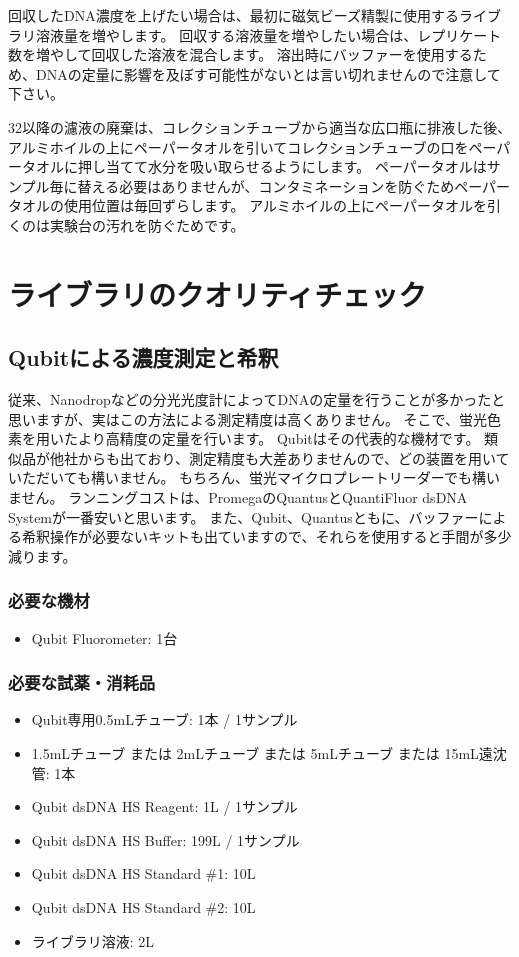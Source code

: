 \documentclass[titlepage,10pt,a4paper,uplatex]{jsbook}
\begin{document}
回収したDNA濃度を上げたい場合は、最初に磁気ビーズ精製に使用するライブラリ溶液量を増やします。
回収する溶液量を増やしたい場合は、レプリケート数を増やして回収した溶液を混合します。
溶出時にバッファーを使用するため、DNAの定量に影響を及ぼす可能性がないとは言い切れませんので注意して下さい。

32以降の濾液の廃棄は、コレクションチューブから適当な広口瓶に排液した後、アルミホイルの上にペーパータオルを引いてコレクションチューブの口をペーパータオルに押し当てて水分を吸い取らせるようにします。
ペーパータオルはサンプル毎に替える必要はありませんが、コンタミネーションを防ぐためペーパータオルの使用位置は毎回ずらします。
アルミホイルの上にペーパータオルを引くのは実験台の汚れを防ぐためです。

\section{ライブラリのクオリティチェック}

\subsection{Qubitによる濃度測定と希釈}

従来、Nanodropなどの分光光度計によってDNAの定量を行うことが多かったと思いますが、実はこの方法による測定精度は高くありません。
そこで、蛍光色素を用いたより高精度の定量を行います。
Qubitはその代表的な機材です。
類似品が他社からも出ており、測定精度も大差ありませんので、どの装置を用いていただいても構いません。
もちろん、蛍光マイクロプレートリーダーでも構いません。
ランニングコストは、PromegaのQuantusとQuantiFluor dsDNA Systemが一番安いと思います。
また、Qubit、Quantusともに、バッファーによる希釈操作が必要ないキットも出ていますので、それらを使用すると手間が多少減ります。

\subsubsection{必要な機材}
\begin{itemize}
\item Qubit Fluorometer: 1台
\end{itemize}

\subsubsection{必要な試薬・消耗品}
\begin{itemize}
\item Qubit専用0.5mLチューブ: 1本 / 1サンプル
\item 1.5mLチューブ または 2mLチューブ または 5mLチューブ または 15mL遠沈管: 1本
\item Qubit dsDNA HS Reagent: 1{\textmu}L / 1サンプル
\item Qubit dsDNA HS Buffer: 199{\textmu}L / 1サンプル
\item Qubit dsDNA HS Standard \#1: 10{\textmu}L
\item Qubit dsDNA HS Standard \#2: 10{\textmu}L
\item ライブラリ溶液: 2{\textmu}L
\end{itemize}
\end{document}
